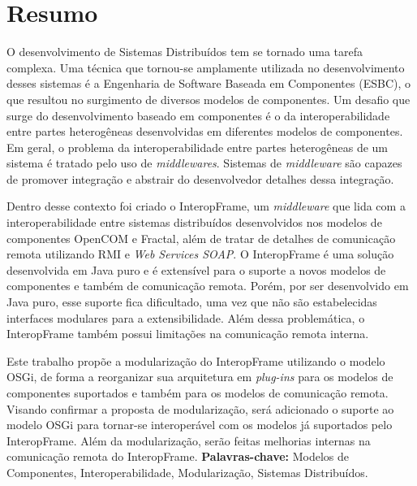 \chapter*{Resumo}

O desenvolvimento de Sistemas Distribu\'idos tem se tornado uma tarefa complexa. Uma t\'ecnica que tornou-se amplamente utilizada no desenvolvimento desses sistemas \'e a Engenharia de Software Baseada em Componentes (ESBC), o que resultou no surgimento de diversos modelos de componentes. Um desafio que surge do desenvolvimento baseado em componentes \'e o da interoperabilidade entre partes heterog\^eneas desenvolvidas em diferentes modelos de componentes. Em geral, o problema da interoperabilidade entre partes heterog\^eneas de um sistema \'e tratado pelo uso de \textit{middlewares}. Sistemas de \textit{middleware} s\~ao capazes de promover integra\c{c}\~ao e abstrair do desenvolvedor detalhes dessa integra\c{c}\~ao.

Dentro desse contexto foi criado o InteropFrame, um \textit{middleware} que lida com a interoperabilidade entre sistemas distribu\'idos desenvolvidos nos modelos de componentes OpenCOM e Fractal, al\'em de tratar de detalhes de comunica\c{c}\~ao remota utilizando RMI e \textit{Web Services SOAP}. O InteropFrame \'e uma solu\c{c}\~ao desenvolvida em Java puro e \'e extens\'ivel para o suporte a novos modelos de componentes e tamb\'em de comunica\c{c}\~ao remota. Por\'em, por ser desenvolvido em Java puro, esse suporte fica dificultado, uma vez que n\~ao s\~ao estabelecidas interfaces modulares para a extensibilidade. Al\'em dessa problem\'atica, o InteropFrame tamb\'em possui limita\c{c}\~oes na comunica\c{c}\~ao remota interna.

Este trabalho prop\~oe a modulariza\c{c}\~ao do InteropFrame utilizando o modelo OSGi, de forma a reorganizar sua arquitetura em \textit{plug-ins} para os modelos de componentes suportados e tamb\'em para os modelos de comunica\c{c}\~ao remota. Visando confirmar a proposta de modulariza\c{c}\~ao, ser\'a adicionado o suporte ao modelo OSGi para tornar-se interoper\'avel com os modelos j\'a suportados pelo InteropFrame. Al\'em da modulariza\c{c}\~ao, ser\~ao feitas melhorias internas na comunica\c{c}\~ao remota do InteropFrame.
\newline
\newline
\noindent \textbf{Palavras-chave:} Modelos de Componentes, Interoperabilidade, Modulariza\c{c}\~ao, Sistemas Distribu\'idos.

